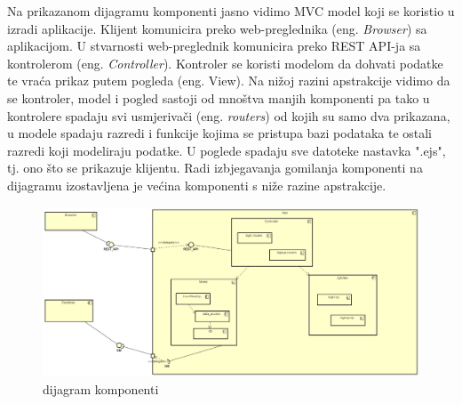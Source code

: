 			 Na prikazanom dijagramu komponenti jasno vidimo MVC model koji se koristio u izradi aplikacije. Klijent komunicira preko web-preglednika (eng. \textit{Browser}) sa aplikacijom. U stvarnosti web-preglednik komunicira preko REST API-ja sa kontrolerom (eng. \textit{Controller}). Kontroler se koristi modelom da dohvati podatke te vraća prikaz putem pogleda (eng. View). Na nižoj razini apstrakcije vidimo da se kontroler, model i pogled sastoji od mnoštva manjih komponenti pa tako u kontrolere spadaju svi usmjerivači (eng. \textit{routers}) od kojih su samo dva prikazana, u modele spadaju razredi i funkcije kojima se pristupa bazi podataka te ostali razredi koji modeliraju podatke. U poglede spadaju sve datoteke nastavka ".ejs", tj. ono što se prikazuje klijentu. Radi izbjegavanja gomilanja komponenti na dijagramu izostavljena je većina komponenti s niže razine apstrakcije.
			 \begin{figure}[H]
			\includegraphics[width=\textwidth]{slike/dijagramKomponenti.png} %
			\caption{dijagram komponenti}
			\label{fig:dijagramKomponenti} %
			\end{figure}